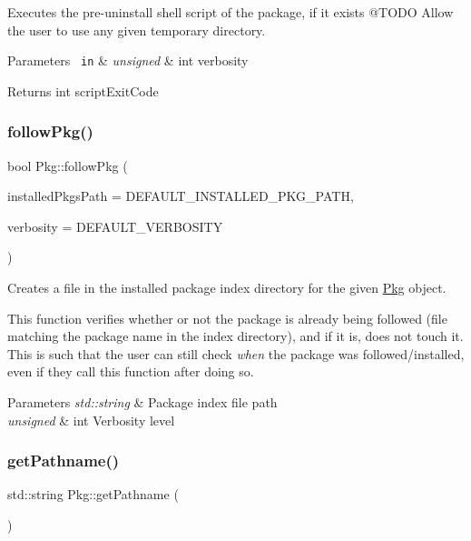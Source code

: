 Executes the pre-\/uninstall shell script of the package, if it exists @\+T\+O\+DO Allow the user to use any given temporary directory. 


\begin{DoxyParams}[1]{Parameters}
\mbox{\texttt{ in}}  & {\em unsigned} & int verbosity\\
\hline
\end{DoxyParams}
\begin{DoxyReturn}{Returns}
int script\+Exit\+Code 
\end{DoxyReturn}
\mbox{\label{classPkg_a533874d8ffcc6ebb0460f5fa2e823d1f}} 
\subsubsection{\texorpdfstring{followPkg()}{followPkg()}}
{\footnotesize\ttfamily bool Pkg\+::follow\+Pkg (\begin{DoxyParamCaption}\item[{std\+::string}]{installed\+Pkgs\+Path = {\ttfamily DEFAULT\+\_\+INSTALLED\+\_\+PKG\+\_\+PATH},  }\item[{unsigned int}]{verbosity = {\ttfamily DEFAULT\+\_\+VERBOSITY} }\end{DoxyParamCaption})}



Creates a file in the installed package index directory for the given \mbox{\hyperlink{classPkg}{Pkg}} object. 

This function verifies whether or not the package is already being followed (file matching the package name in the index directory), and if it is, does not touch it. This is such that the user can still check {\itshape when} the package was followed/installed, even if they call this function after doing so.


\begin{DoxyParams}{Parameters}
{\em std\+::string} & Package index file path \\
\hline
{\em unsigned} & int Verbosity level \\
\hline
\end{DoxyParams}
\mbox{\label{classPkg_a6e2ea56742915496002b4c0625a6b410}} 
\subsubsection{\texorpdfstring{getPathname()}{getPathname()}}
{\footnotesize\ttfamily std\+::string Pkg\+::get\+Pathname (\begin{DoxyParamCaption}{ }\end{DoxyParamCaption})}



